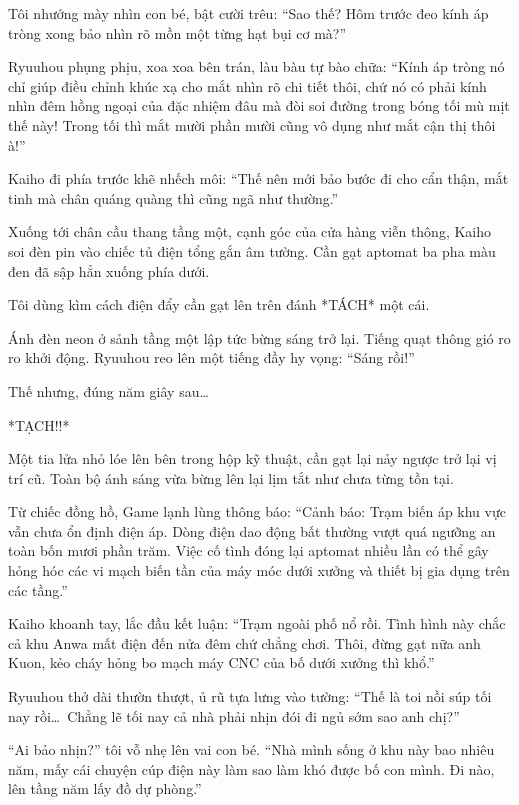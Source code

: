 \documentclass[../main.tex]{subfiles}
\begin{document}
Tôi nhướng mày nhìn con bé, bật cười trêu: ``Sao thế? Hôm trước đeo kính áp tròng xong bảo nhìn rõ mồn một từng hạt bụi cơ mà?''

Ryuuhou phụng phịu, xoa xoa bên trán, làu bàu tự bào chữa: ``Kính áp tròng nó chỉ giúp điều chỉnh khúc xạ cho mắt nhìn rõ chi tiết thôi, chứ nó có phải kính nhìn đêm hồng ngoại của đặc nhiệm đâu mà đòi soi đường trong bóng tối mù mịt thế này! Trong tối thì mắt mười phần mười cũng vô dụng như mắt cận thị thôi à!''

Kaiho đi phía trước khẽ nhếch môi: ``Thế nên mới bảo bước đi cho cẩn thận, mắt tinh mà chân quáng quàng thì cũng ngã như thường.''

Xuống tới chân cầu thang tầng một, cạnh góc của cửa hàng viễn thông, Kaiho soi đèn pin vào chiếc tủ điện tổng gắn âm tường. Cần gạt aptomat ba pha màu đen đã sập hẳn xuống phía dưới.

Tôi dùng kìm cách điện đẩy cần gạt lên trên đánh *TÁCH* một cái.

Ánh đèn neon ở sảnh tầng một lập tức bừng sáng trở lại. Tiếng quạt thông gió ro ro khởi động. Ryuuhou reo lên một tiếng đầy hy vọng: ``Sáng rồi!''

Thế nhưng, đúng năm giây sau\dots

*TẠCH!!*

Một tia lửa nhỏ lóe lên bên trong hộp kỹ thuật, cần gạt lại nảy ngược trở lại vị trí cũ. Toàn bộ ánh sáng vừa bừng lên lại lịm tắt như chưa từng tồn tại.

Từ chiếc đồng hồ, Game lạnh lùng thông báo: ``Cảnh báo: Trạm biến áp khu vực vẫn chưa ổn định điện áp. Dòng điện dao động bất thường vượt quá ngưỡng an toàn bốn mươi phần trăm. Việc cố tình đóng lại aptomat nhiều lần có thể gây hỏng hóc các vi mạch biến tần của máy móc dưới xưởng và thiết bị gia dụng trên các tầng.''

Kaiho khoanh tay, lắc đầu kết luận: ``Trạm ngoài phố nổ rồi. Tình hình này chắc cả khu Anwa mất điện đến nửa đêm chứ chẳng chơi. Thôi, đừng gạt nữa anh Kuon, kẻo cháy hỏng bo mạch máy CNC của bố dưới xưởng thì khổ.''

Ryuuhou thở dài thườn thượt, ủ rũ tựa lưng vào tường: ``Thế là toi nồi súp tối nay rồi\dots\ Chẳng lẽ tối nay cả nhà phải nhịn đói đi ngủ sớm sao anh chị?''

``Ai bảo nhịn?'' tôi vỗ nhẹ lên vai con bé. ``Nhà mình sống ở khu này bao nhiêu năm, mấy cái chuyện cúp điện này làm sao làm khó được bố con mình. Đi nào, lên tầng năm lấy đồ dự phòng.''

\ct
\end{document}
